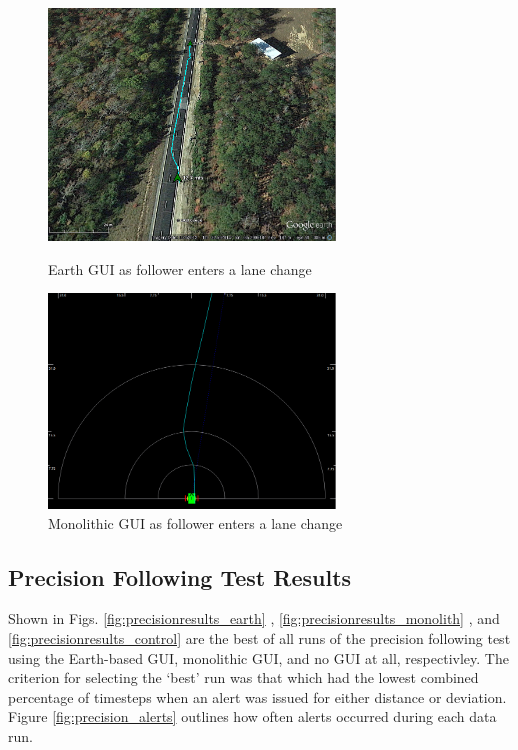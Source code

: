 \begin{figure}[ht] \centering
    \begin{minipage}[b]{0.45\linewidth} \centering 
        \includegraphics[width=3in]{./figs/lane_change.png}
        \caption{Earth GUI as follower enters a lane change} \label{fig:lanechange_earth}
    \end{minipage}
    \hspace{0.5cm}
    \begin{minipage}[b]{0.45\linewidth} \centering
        \includegraphics[width=3in]{./figs/lane_change_mono.png}
        \caption{Monolithic GUI as follower enters a lane change} \label{fig:lanechange_mono}
    \end{minipage}
\end{figure}





\subsection{Precision Following Test Results} \label{sec:precisionfollowingresults}

Shown in Figs. \ref{fig:precisionresults_earth} , \ref{fig:precisionresults_monolith} , and \ref{fig:precisionresults_control} are the best of all runs of the precision following test using the Earth-based GUI, monolithic GUI, and no GUI at all, respectivley. The criterion for selecting the `best' run was that which had the lowest combined percentage of timesteps when an alert was issued for either distance or deviation. Figure \ref{fig:precision_alerts} outlines how often alerts occurred during each data run.




